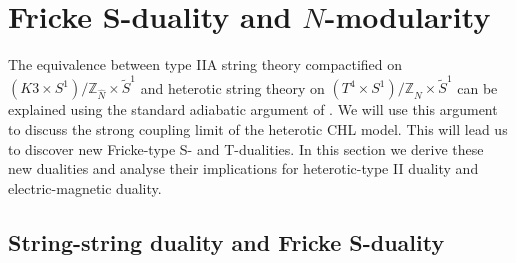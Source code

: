 \documentclass[a4paper,11pt]{article}
\newcommand{\ZZ}{\mathbb{Z}}
\numberwithin{equation}{section}
\begin{document}
\section{Fricke S-duality and $N$-modularity}\label{s:Sdual}

The equivalence between type IIA string theory compactified on $(K3\times S^1)/\ZZ_{\hat N}\times \tilde S^1$ and heterotic string theory on $(T^4\times S^1)/\ZZ_{\hat N}\times \tilde S^1$ can be explained using the standard adiabatic argument of \cite{VafaWitten95}. We will use this argument to discuss the strong coupling limit of the heterotic CHL model. This will lead us to discover new Fricke-type S- and T-dualities. In this section we derive these new dualities and analyse their implications for heterotic-type II duality and electric-magnetic duality.

\subsection{String-string duality and Fricke S-duality}
\end{document}
